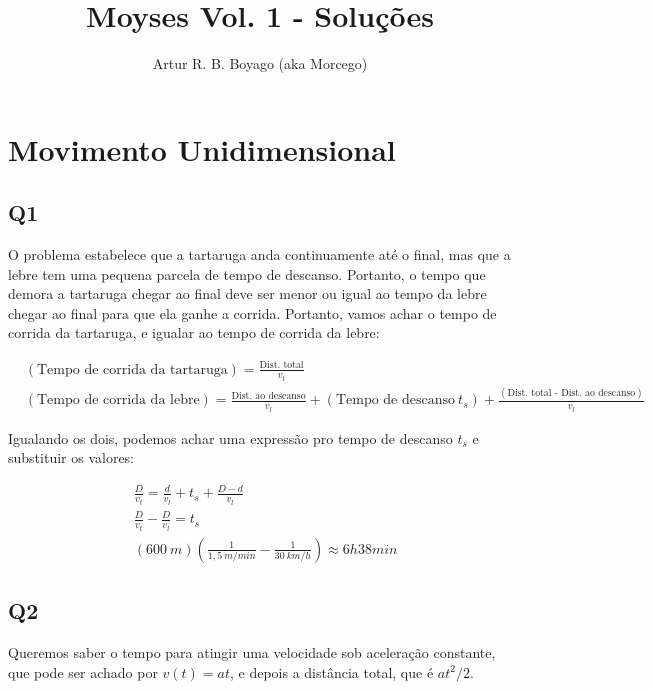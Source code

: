 \documentclass{antiquebook}
\author{Artur R. B. Boyago (aka Morcego)}
\title{{Moyses Vol. 1 - Soluções}}
\begin{document}
	\frontmatter
	\maketitle

	\tableofcontents

	\mainmatter
	\pagestyle{fancy}

	\chapter{Movimento Unidimensional}

	\section{Q1}
	
	O problema estabelece que a tartaruga anda continuamente até o final, mas que a lebre tem uma 
	pequena parcela de tempo de descanso. Portanto, o tempo que demora a tartaruga chegar ao final deve
	ser menor ou igual ao tempo da lebre chegar ao final para que ela ganhe a corrida. Portanto, vamos achar o tempo de corrida da tartaruga, e igualar ao tempo de corrida da lebre:

\begin{align*}
	&(\text{Tempo de corrida da tartaruga}) = \frac{\text{Dist. total}}{v_t} \\
	&(\text{Tempo de corrida da lebre}) = \frac{\text{Dist. ao descanso}}{v_l}+ (\text{Tempo de descanso} \ t_s)+\frac{(\text{Dist. total - Dist. ao descanso})}{v_l}
\end{align*}	

	Igualando os dois, podemos achar uma expressão pro tempo de descanso $t_s$ e substituir os valores:

\begin{align*}
	&\frac{D}{v_t} = \frac{d}{v_l} + t_s + \frac{D-d}{v_l} \\
	&\frac{D}{v_t} - \frac{D}{v_l} = t_s \\
	&(600 \ \si{m}) \left ( \frac{1}{1,5 \ \si{m/min}} - \frac{1}{30 \ \si{km/h}} \right ) \approx 6\si{h}38\si{min}
\end{align*}

	\section{Q2}

	Queremos saber o tempo para atingir uma velocidade sob aceleração constante, 
	que pode ser achado por $v(t)=at$, e
	depois a distância total, que é $at^2/2$.
\end{document}
